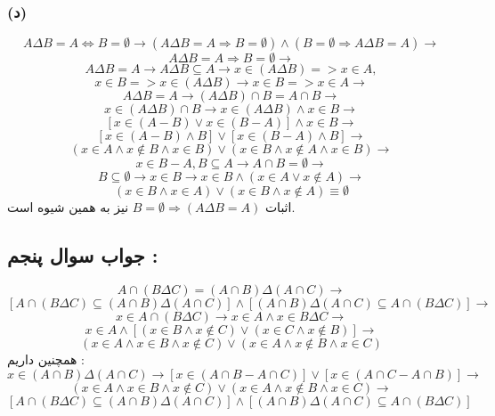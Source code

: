 \documentclass{article}
\begin{document}
            \subsubsection*{(د)}
                \[A \Delta B = A \Leftrightarrow B = \emptyset \rightarrow (A \Delta B = A \Rightarrow B = \emptyset) \land (B = \emptyset \Rightarrow A \Delta B = A) \rightarrow\]
                \[A \Delta B = A \Rightarrow B = \emptyset \rightarrow \]
                \[A \Delta B = A \rightarrow A \Delta B \subseteq A \rightarrow x \in (A \Delta B) => x \in A, \]
                \[x \in B => x \in (A \Delta B) \rightarrow x \in B => x \in A \rightarrow\]
                \[A \Delta B = A \rightarrow (A \Delta B) \cap B = A \cap B \rightarrow\]
                \[x \in (A \Delta B) \cap B \rightarrow x \in (A \Delta B) \land x \in B \rightarrow\]
                \[[x \in (A - B) \lor x \in (B - A)] \land x \in B \rightarrow\]
                \[[x \in (A - B) \land B] \lor [x \in (B - A) \land B] \rightarrow\]
                \[(x \in A \land x \not \in B \land x \in B) \lor (x \in B \land x \not \in A \land x \in B) \rightarrow\]
                \[x \in B - A, B \subseteq A \rightarrow A \cap B = \emptyset \rightarrow\]
                \[B \subseteq \emptyset \rightarrow x \in B \rightarrow x \in B \land (x \in A \lor x \not \in A) \rightarrow\]
                \[(x \in B \land x \in A) \lor (x \in B \land x \not \in A) \equiv \emptyset\]
                اثبات $B = \emptyset \Rightarrow (A \Delta B = A)$ نیز به همین شیوه است.

        \subsection*{جواب سوال پنجم : }
            \[A \cap (B \Delta C) = (A \cap B) \Delta (A \cap C) \rightarrow\]
            \[[A \cap (B \Delta C) \subseteq (A \cap B) \Delta (A \cap C)] \land [(A \cap B) \Delta (A \cap C)\subseteq A \cap (B \Delta C)] \rightarrow\]
            \[x \in A \cap (B \Delta C) \rightarrow x \in A \land x \in B \Delta C \rightarrow\]
            \[x \in A \land [(x \in B \land x \not \in C) \lor (x \in C \land x \not \in B)] \rightarrow\]
            \[(x \in A \land x \in B \land x \not \in C) \lor (x \in A \land x \not \in B \land x \in C)\]
            همچنین داریم :\\
            \[x \in (A \cap B) \Delta (A \cap C) \rightarrow [x \in (A \cap B - A \cap C)] \lor [x \in (A \cap C - A \cap B)] \rightarrow\]
            \[(x \in A \land x \in B \land x \not \in C) \lor (x \in A \land x \not \in B \land x \in C) \rightarrow\]
            \[[A \cap (B \Delta C) \subseteq (A \cap B) \Delta (A \cap C)] \land [(A \cap B) \Delta (A \cap C)\subseteq A \cap (B \Delta C)]\]
\end{document}
